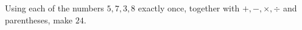 Using each of the numbers $5,7,3,8$ exactly once, together with $+,-,\times,\div$ and parentheses, make $24$.
